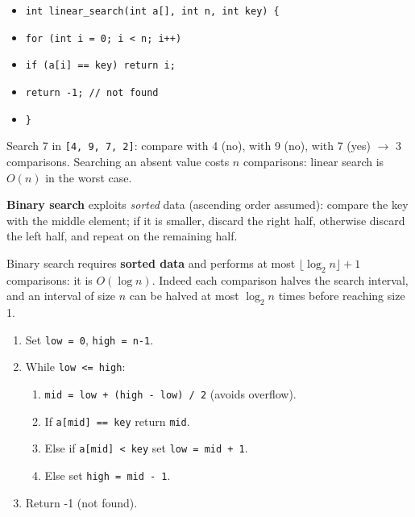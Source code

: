 \documentclass[11pt]{article}
\begin{document}
\begin{exemplebox}
\begin{itemize}
\item \texttt{int linear\_search(int a[], int n, int key) \{}
\item \texttt{\quad for (int i = 0; i < n; i++)}
\item \texttt{\quad\quad if (a[i] == key) return i;}
\item \texttt{\quad return -1; // not found}
\item \texttt{\}}
\end{itemize}
\end{exemplebox}

\begin{exemplebox}
Search 7 in \texttt{[4, 9, 7, 2]}: compare with 4 (no), with 9 (no), with 7 (yes) $\to$ 3 comparisons. Searching an absent value costs $n$ comparisons: linear search is $O(n)$ in the worst case.
\end{exemplebox}

\textbf{Binary search} exploits \emph{sorted} data (ascending order assumed): compare the key with the middle element; if it is smaller, discard the right half, otherwise discard the left half, and repeat on the remaining half.

\begin{propriete}
Binary search requires \textbf{sorted data} and performs at most $\lfloor \log_2 n \rfloor + 1$ comparisons: it is $O(\log n)$. Indeed each comparison halves the search interval, and an interval of size $n$ can be halved at most $\log_2 n$ times before reaching size 1.
\end{propriete}

\begin{methode}
\begin{enumerate}
\item Set \texttt{low = 0}, \texttt{high = n-1}.
\item While \texttt{low <= high}:
  \begin{enumerate}
  \item \texttt{mid = low + (high - low) / 2} (avoids overflow).
  \item If \texttt{a[mid] == key} return \texttt{mid}.
  \item Else if \texttt{a[mid] < key} set \texttt{low = mid + 1}.
  \item Else set \texttt{high = mid - 1}.
  \end{enumerate}
\item Return -1 (not found).
\end{enumerate}
\end{methode}
\end{document}
